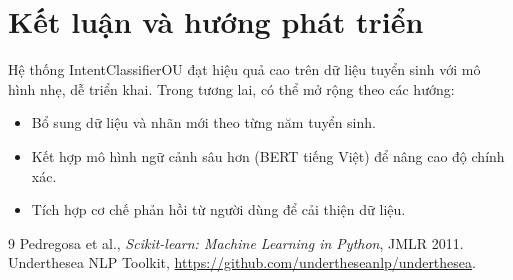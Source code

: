 \documentclass[12pt,a4paper]{article}
\begin{document}
\section{Kết luận và hướng phát triển}
Hệ thống IntentClassifierOU đạt hiệu quả cao trên dữ liệu tuyển sinh với mô hình nhẹ,
dễ triển khai. Trong tương lai, có thể mở rộng theo các hướng:
\begin{itemize}
    \item Bổ sung dữ liệu và nhãn mới theo từng năm tuyển sinh.
    \item Kết hợp mô hình ngữ cảnh sâu hơn (BERT tiếng Việt) để nâng cao độ chính xác.
    \item Tích hợp cơ chế phản hồi từ người dùng để cải thiện dữ liệu.
\end{itemize}

\begin{thebibliography}{9}
     Pedregosa et al., \textit{Scikit-learn: Machine Learning in Python}, JMLR 2011.
     Underthesea NLP Toolkit, \url{https://github.com/undertheseanlp/underthesea}.
\end{thebibliography}
\end{document}
